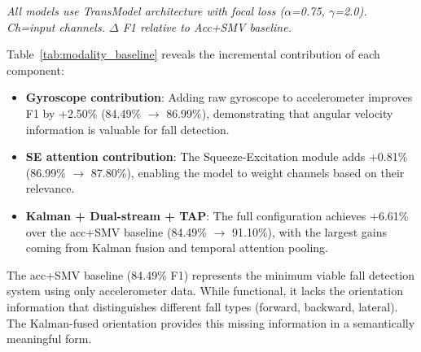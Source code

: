 \begin{table}[htbp]
\centering
\caption{Modality Baseline Comparison (21-fold LOSO-CV Test Results)}
\label{tab:modality_baseline}
\vspace{1mm}
\scriptsize
\textit{All models use TransModel architecture with focal loss ($\alpha$=0.75, $\gamma$=2.0). Ch=input channels. $\Delta$ F1 relative to Acc+SMV baseline.}
\end{table}

Table~\ref{tab:modality_baseline} reveals the incremental contribution of each component:
\begin{itemize}
    \item \textbf{Gyroscope contribution}: Adding raw gyroscope to accelerometer improves F1 by +2.50\% (84.49\% $\rightarrow$ 86.99\%), demonstrating that angular velocity information is valuable for fall detection.
    \item \textbf{SE attention contribution}: The Squeeze-Excitation module adds +0.81\% (86.99\% $\rightarrow$ 87.80\%), enabling the model to weight channels based on their relevance.
    \item \textbf{Kalman + Dual-stream + TAP}: The full configuration achieves +6.61\% over the acc+SMV baseline (84.49\% $\rightarrow$ 91.10\%), with the largest gains coming from Kalman fusion and temporal attention pooling.
\end{itemize}

The acc+SMV baseline (84.49\% F1) represents the minimum viable fall detection system using only accelerometer data. While functional, it lacks the orientation information that distinguishes different fall types (forward, backward, lateral). The Kalman-fused orientation provides this missing information in a semantically meaningful form.

